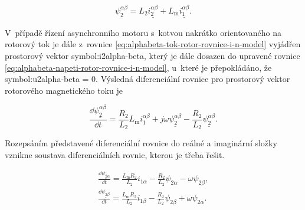 \documentclass[a4paper, twoside, 11pt]{article}
\begin{document}
		\begin{equation}\label{eq:alphabeta-tok-rotor-rovnice-i-n-model}
			\underline{\psi_2^{\alpha \beta}} = L_2 \underline{i_2^{\alpha \beta}} + L_\text{m} \underline{i_1^{\alpha \beta}}.
		\end{equation}

		V~případě řízení asynchronního motoru s~kotvou nakrátko orientovaného na rotorový tok je dále z~rovnice \ref{eq:alphabeta-tok-rotor-rovnice-i-n-model} vyjádřen prostorový vektor \gls{symbol:i2alpha-beta}, který je dále dosazen do upravené rovnice \ref{eq:alphabeta-napeti-rotor-rovnice-i-n-model}, u~které je přepokládáno, že \gls{symbol:u2alpha-beta} = 0.
		Výsledná diferenciální rovnice pro prostorový vektor rotorového magnetického toku je

		\begin{equation}
			\frac{\dd{\underline{\psi_{2}^{\alpha \beta}}}}{\dd{t}} = \frac{R_2}{L_2}L_\text{m} i_1^{\alpha \beta} + j \omega \underline{\psi_2^{\alpha \beta}} - \frac{R_2}{L_2} \underline{\psi_2^{\alpha \beta}}.
		\end{equation}

		Rozepsáním představené diferenciální rovnice do reálné a imaginární složky vznikne soustava diferenciálních rovnic, kterou je třeba řešit.

		\begin{equation}\label{eq:i-n-model-psi-2-diff-for-rk-4}
			\begin{gathered}
				\frac{\dd{\underline{\psi_{2\alpha}}}}{\dd{t}} = \frac{L_\text{m} R_2}{L_2} i_{1\alpha} - \frac{R_2}{L_2} \psi_{2\alpha} - \omega \psi_{2\beta},\\\frac{\dd{\underline{\psi_{2\beta}}}}{\dd{t}} = \frac{L_\text{m} R_2}{L_2} i_{1\beta} - \frac{R_2}{L_2} \psi_{2\beta} + \omega \psi_{2\alpha}.
			\end{gathered}
		\end{equation}
\end{document}
